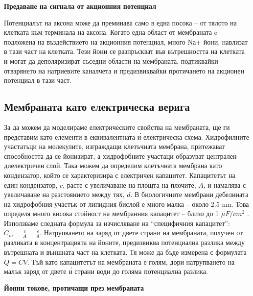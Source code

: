 \documentclass{article}
\numberwithin{equation}{section}
\begin{document}
\vspace{5mm} %
\textbf{Предаване на сигнала от акционния потенциал}

Потенциалът на аксона може да преминава само в една посока -- от тялото на клетката към терминала на аксона. Когато една област от
мембраната e подложена на въздействието на акционния потенциал, много Nа+ йони, навлизат в тази част на клетката. Тези йони се разпръскват
във вътрешността на клетката и могат да деполяризират съседни области на мембраната, подтиквайки отварянето на натриевите каналчета и
предизвиквайки протичането на акционен потенциал в тази част.

\vspace{5mm} %
\subsection{Мембраната като електрическа верига}

За да можем да моделираме електрическите свойства на мембраната, ще ги представим като елементи в еквивалентната \'{и} електрическа схема.
Хидрофилните участатъци на молекулите, изграждащи клетъчната мембрана, притежават способността да се йонизират, а хидрофобните участаци
образуват централен диелектричен слой. Така можем да определим клетъчната мембрана като кондензатор, който се характеризира с електричен
капацитет. Капацитетът на един кондензатор, $c$, расте с увеличаване на площта на плочите, $A$, и намалява с увеличаване на разстоянието
между тях, $d$. В биологичните мембрани дебелината на хидрофобния участък от липидния бислой е много малка – около 2.5 nm. Това определя
много висока стойност на мембранния капацитет – близо до 1 $\mu F/cm^2$ .  Използваме следната формула за изчисляване на “специфичния
капацитет”: $C_{m}=\frac{c}{A}=\frac{\epsilon}{d}$. Натрупването на заряд от двете страни на мембраната, получен от разликата в
концентрацията на йоните, предизвиква потенциална разлика между вътрешната и външната част на клетката. Тя може да бъде измерена с формулата
$Q=CV$. Тъй като капацитетът на мембраната е голям, дори натрупването на малък заряд от двете \'{и} страни води до голяма потенциална
разлика. 

\vspace{5mm} %
\textbf{Йонни токове, протичащи през мембраната}
\end{document}

